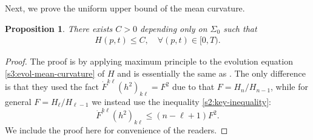\documentclass[11pt,reqno]{amsart}
\newtheorem{prop}[thm]{Proposition}
\theoremstyle{definition}
\theoremstyle{remark}
\numberwithin{equation}{section}
\renewcommand{\(}{\left(}
\renewcommand{\)}{\right)}
\renewcommand{\-}{\overline}
\begin{document}
Next, we prove the uniform upper bound of the mean curvature.
\begin{prop}\label{s4:upper-bound-H}
	There exists $C>0$ depending only on $\Sigma_0$ such that
	\begin{align*}
	H(p,t)\leq C, \quad \forall (p,t)\in [0, T).
	\end{align*}
\end{prop}
\begin{proof}
	The proof is by applying maximum principle to the evolution equation \eqref{s3:evol-mean-curvature} of $H$ and is essentially the same as \cite[Proposition 4.8]{Wang-Weng-Xia2022}. The only difference is that they used the fact $\dot{F}^{k\ell}(h^2)_{k\ell}=F^2$ due to that  $F=H_n/H_{n-1}$, while for general $F=H_\ell/H_{\ell-1}$ we instead use the inequality \eqref{s2:key-inequality}:
\begin{equation}\label{s6.F}
\dot{F}^{k\ell}(h^2)_{k\ell}\leq (n-\ell+1)F^2.
\end{equation}
 We include the proof here for convenience of the readers.


\end{proof}
\end{document}
